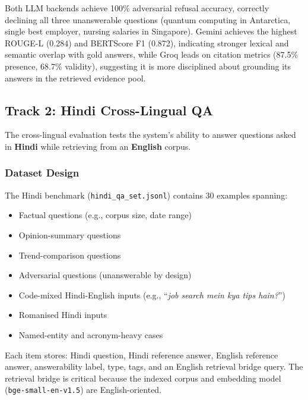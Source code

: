 \documentclass[11pt,a4paper]{article}
\begin{document}
Both LLM backends achieve 100\% adversarial refusal accuracy, correctly declining all three unanswerable questions (quantum computing in Antarctica, single best employer, nursing salaries in Singapore). Gemini achieves the highest ROUGE-L (0.284) and BERTScore F1 (0.872), indicating stronger lexical and semantic overlap with gold answers, while Groq leads on citation metrics (87.5\% presence, 68.7\% validity), suggesting it is more disciplined about grounding its answers in the retrieved evidence pool.


\subsection{Track 2: Hindi Cross-Lingual QA}
\label{sec:eval-hindi}

The cross-lingual evaluation tests the system's ability to answer questions asked in \textbf{Hindi} while retrieving from an \textbf{English} corpus.

\subsubsection{Dataset Design}

The Hindi benchmark (\texttt{hindi\_qa\_set.jsonl}) contains 30 examples spanning:
\begin{itemize}[leftmargin=*]
  \item Factual questions (e.g., corpus size, date range)
  \item Opinion-summary questions
  \item Trend-comparison questions
  \item Adversarial questions (unanswerable by design)
  \item Code-mixed Hindi-English inputs (e.g., ``\textit{job search mein kya tips hain?}'')
  \item Romanised Hindi inputs
  \item Named-entity and acronym-heavy cases
\end{itemize}

Each item stores: Hindi question, Hindi reference answer, English reference answer, answerability label, type, tags, and an English retrieval bridge query. The retrieval bridge is critical because the indexed corpus and embedding model (\texttt{bge-small-en-v1.5}) are English-oriented.
\end{document}
